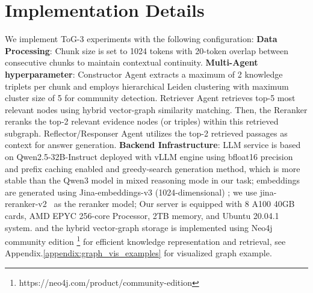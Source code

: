 \section{Implementation Details}
\label{appendix:imple_detail}

We implement ToG-3 experiments with the following configuration:
\textbf{Data Processing}: Chunk size is set to 1024 tokens with 20-token overlap between consecutive chunks to maintain contextual continuity.
\textbf{Multi-Agent hyperparameter}: Constructor Agent extracts a maximum of 2 knowledge triplets per chunk and employs hierarchical Leiden clustering \citep{traag2019Leiden} with maximum cluster size of 5 for community detection. Retriever Agent retrieves top-5 most relevant nodes using hybrid vector-graph similarity matching. Then, the Reranker reranks the top-2 relevant evidence nodes (or triples) within this retrieved subgraph. Reflector/Responser Agent utilizes the top-2 retrieved passages as context for answer generation.
\textbf{Backend Infrastructure}: LLM service is based on Qwen2.5-32B-Instruct \citep{qwen2.5} deployed with vLLM \citep{vllm} engine using bfloat16 precision and prefix caching enabled and greedy-search generation method, which is more stable than the Qwen3 model in mixed reasoning mode in our task; embeddings are generated using Jina-embeddings-v3 (1024-dimensional) \citep{sturua2024jinaembeddingsv3}; we use jina-reranker-v2~\citep{wang2025jina-reranker-v3} as the reranker model; 
Our server is equipped with 8 A100 40GB cards, AMD EPYC 256-core Processor, 2TB memory, and Ubuntu 20.04.1 system.
and the hybrid vector-graph storage is implemented using Neo4j community edition \footnote{https://neo4j.com/product/community-edition} for efficient knowledge representation and retrieval, see Appendix.\ref{appendix:graph_vis_examples} for visualized graph example.